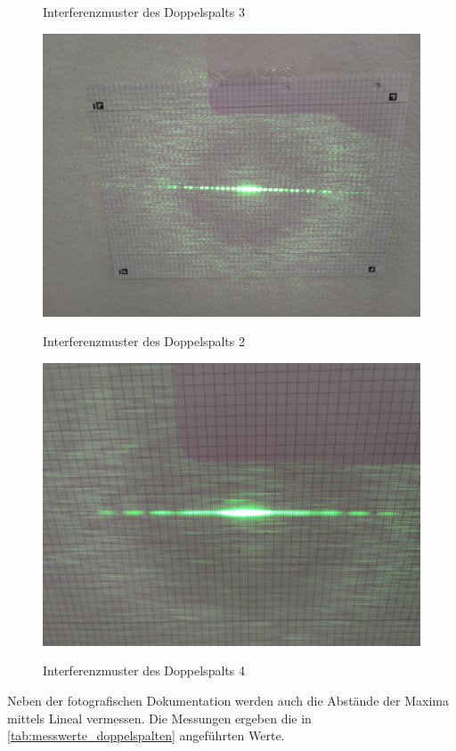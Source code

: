 \documentclass[ngerman]{scrartcl}
\begin{document}
\begin{figure}[H]
\begin{minipage}[t]{0.45\linewidth}
        \caption{Interferenzmuster des Doppelspalts 3}
        \label{fig:DS_3_interferenzmuster}
    \end{minipage}%
    \hspace*{\fill}
    \begin{minipage}[t]{0.45\linewidth}
        \centering
        \includegraphics[width=\linewidth]{fig/Compressed/DS2_0_10_25.jpg}
        \caption{Interferenzmuster des Doppelspalts 2}
        \label{fig:DS_2_interferenzmuster}
        \includegraphics[width=\linewidth]{fig/Compressed/DS4_0_11.jpg}
        \caption{Interferenzmuster des Doppelspalts 4}
        \label{fig:DS_4_interferenzmuster}
    \end{minipage}
\end{figure}
\setcaphanging
%
Neben der fotografischen Dokumentation werden auch die Abstände der Maxima mittels Lineal vermessen. Die Messungen ergeben die in \autoref{tab:messwerte_doppelspalten} angeführten Werte.
\end{document}
